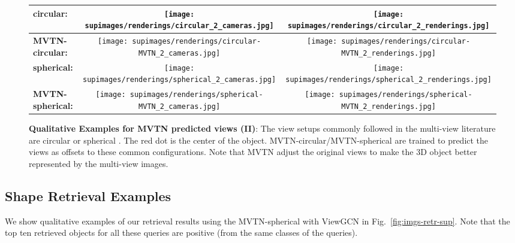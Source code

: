 \documentclass[10pt,twocolumn,letterpaper]{article}
\newcommand{\figLabel}{Fig.~}
\begin{document}
\begin{figure*} [h]
\begin{tabular}{lc|c}
\textbf{circular:} \hspace{10pt}  & \texttt{[image: supimages/renderings/circular\_2\_cameras.jpg]} &
\texttt{[image: supimages/renderings/circular\_2\_renderings.jpg]} \\ \hline
\textbf{MVTN-circular:}  &\texttt{[image: supimages/renderings/circular-MVTN\_2\_cameras.jpg]} &
\texttt{[image: supimages/renderings/circular-MVTN\_2\_renderings.jpg]} \\ \hline
 \textbf{spherical:} \hspace{10pt} &\texttt{[image: supimages/renderings/spherical\_2\_cameras.jpg]} &
\texttt{[image: supimages/renderings/spherical\_2\_renderings.jpg]} \\ \hline
 \textbf{MVTN-spherical:}  & \texttt{[image: supimages/renderings/spherical-MVTN\_2\_cameras.jpg]} &
\texttt{[image: supimages/renderings/spherical-MVTN\_2\_renderings.jpg]} \\
\bottomrule
\end{tabular}
\vspace{4pt}
\caption{\small \textbf{Qualitative Examples for MVTN predicted views (II)}: The view setups commonly followed  in the multi-view literature are circular \cite{mvcnn} or spherical \cite{mvviewgcn,mvrotationnet}. The red dot is the center of the object.  MVTN-circular/MVTN-spherical are trained to predict the views as offsets to these common configurations. Note that MVTN adjust the original views to make the 3D object better represented by the multi-view images.
}
    \label{fig:views-mvt-sup-2}
\end{figure*}

\subsection{Shape Retrieval Examples}
We show qualitative examples of our retrieval results using the MVTN-spherical with ViewGCN in \figLabel{\ref{fig:imgs-retr-sup}}. Note that the top ten retrieved objects for all these queries are positive (from the same classes of the queries). 
\end{document}
